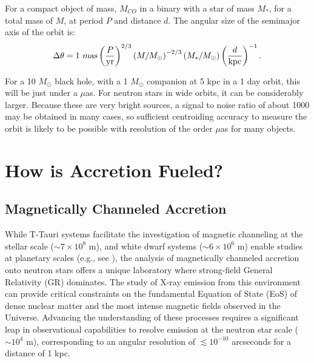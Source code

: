 \documentclass{article}
\begin{document}
For a compact object of mass, $M_{CO}$ in a binary with a star of mass $M_*$, for a total mass of $M$, at period $P$ and distance $d$.  The angular size of the semimajor axis of the orbit is:
\begin{equation}
    \Delta \theta = 1~m{\rm as} \left(\frac{P}{\rm yr}\right)^{2/3} \left(M/M_\odot\right)^{-2/3} (M_*/M_\odot) \left(\frac{d}{\rm kpc}\right)^{-1}.
\end{equation}

For a 10 $M_\odot$ black hole, with a 1 $M_\odot$ companion at 5 kpc in a 1 day orbit, this will be just under a $\mu$as.  For neutron stars in wide orbits, it can be considerably larger.  Because these are very bright sources, a signal to noise ratio of about 1000 may be obtained in many cases, so sufficient centroiding accuracy to measure the orbit is likely to be possible with resolution of the order $\mu$as for many objects.


\section{How is Accretion Fueled?}  
\label{sec:accretion_fuel}

\subsection{Magnetically Channeled Accretion} 
While T-Tauri systems facilitate the investigation of magnetic channeling at the stellar
scale ($\sim7\times10^8$ m), and white dwarf systems ($\sim6\times10^6$ m) enable studies at planetary scales (e.g., see \cite{hires_stellar}), the
analysis of magnetically channeled accretion onto neutron stars offers a unique laboratory
where strong-field General Relativity (GR) dominates. The study of X-ray emission from
this environment can provide critical constraints on the fundamental Equation of State
(EoS) of dense nuclear matter and the most intense magnetic fields observed in the
Universe. Advancing the understanding of these processes requires a significant leap
in observational capabilities to resolve emission at the neutron star scale ($\sim 10^4$ m),
corresponding to an angular resolution of $\lesssim10^{-10}$ arcseconds for a distance of 1 kpc. 
\end{document}

